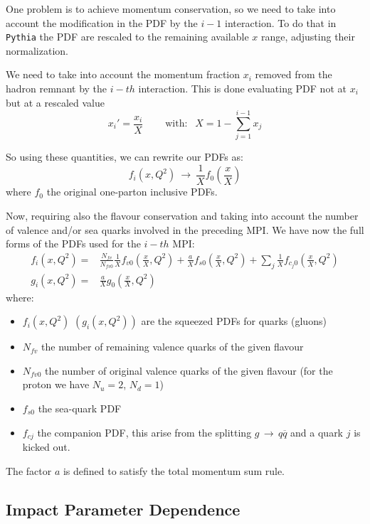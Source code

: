 One problem is to achieve momentum conservation, so we need to take into account the modification in the PDF by the $i-1$ interaction. To do that in \texttt{Pythia} the PDF are rescaled to the remaining available $x$ range, adjusting their normalization.

We need to take into account the momentum fraction $x_i$ removed from the hadron remnant by the $i-th$ interaction. This is done evaluating PDF not at $x_i$ but at a rescaled value
\begin{equation}
	x_i'=\frac{x_i}{X} \qquad \ \text{with: }\ \ X=1-\sum_{j=1}^{i-1}x_j
\end{equation}

So using these quantities, we can rewrite our PDFs as:
\begin{equation}
	f_i(x,Q^2)\ \longrightarrow\ \frac{1}{X}f_0\left(\frac{x}{X}\right)
\end{equation}
where $f_0$ the original one-parton inclusive PDFs.

Now, requiring also the flavour conservation and taking into account the number of valence and/or sea quarks involved in the preceding MPI. We have now the full forms of the PDFs used for the $i-th$ MPI:
\begin{align}
f_i(x,Q^2) =&  \frac{N_{fv}}{N_{fv0}}\frac{1}{X} f_{v0}\left( \frac{x}{X},Q^2 \right) + \frac{a}{X}f_{s0}\left( \frac{x}{X},Q^2 \right)+\displaystyle\sum_j \frac{1}{X} f_{c_j0}\left( \frac{x}{X},Q^2 \right) \\
g_i(x,Q^2) =& \frac{a}{X}g_0\left( \frac{x}{X},Q^2 \right) 
\end{align}
where: 
\begin{itemize}
	\item $f_i(x,Q^2)$ $(g_i(x,Q^2))$ are the squeezed PDFs for quarks (gluons)
	\item $N_{fv}$ the number of remaining valence quarks of the given flavour
	\item $N_{fv0}$ the number of original valence quarks of the given flavour (for the proton we have $N_u=2$, $N_d=1$)
	\item $f_{s0}$ the sea-quark PDF
	\item $f_{cj}$ the companion PDF, this arise from the splitting $g\,\rightarrow\,q\overline{q}$ and a quark $j$ is kicked out.
\end{itemize}
The factor $a$ is defined to satisfy the total momentum sum rule.

\subsection{Impact Parameter Dependence}

